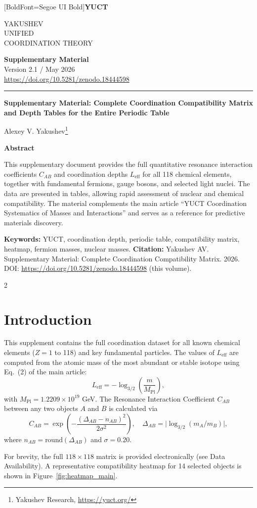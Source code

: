 \documentclass[11pt,a4paper]{article}
\newcommand{\makeheader}{%
	\noindent
	\begin{minipage}{0.17\textwidth}
		\raggedright
		{\fontspec{Segoe UI}[BoldFont=Segoe UI Bold]\bfseries\color{skyblue}\fontsize{46}{46}\selectfont YUCT}%
	\end{minipage}%
	\hspace{30pt}
	\begin{minipage}{0.32\textwidth}
		\raggedright
		{\sffamily\fontsize{11}{13}\selectfont YAKUSHEV\\ UNIFIED\\ COORDINATION THEORY}%
	\end{minipage}%
	\hfill
	\begin{minipage}{0.38\textwidth}
		\raggedleft
		{\sffamily\bfseries Supplementary Material}\\ 
		{\sffamily Version 2.1 / May 2026}\\ 
		{\sffamily\footnotesize \url{https://doi.org/10.5281/zenodo.18444598}}%
	\end{minipage}
	\par\vspace{5pt}
	\noindent\textcolor{gold}{\rule{\textwidth}{1.6pt}}
	\par\vspace{0pt}
}
\begin{document}
	\thispagestyle{firstpage}
	\makeheader
	
	\vspace{0cm}
	{\LARGE\bfseries Supplementary Material: Complete Coordination Compatibility Matrix \\ 
		\Large and Depth Tables for the Entire Periodic Table \par}
	\vspace{0.2cm}
	
	{\large Alexey V. Yakushev\footnote{Yakushev Research, \url{https://yuct.org/}}} \\
	\vspace{0.0cm}
	
	{\color{darkblue}\textbf{\LARGE Abstract}} \par
	{\large
		\noindent
		This supplementary document provides the full quantitative resonance interaction coefficients \(C_{AB}\) and coordination depths \(L_{\mathrm{eff}}\) for all 118 chemical elements, together with fundamental fermions, gauge bosons, and selected light nuclei. The data are presented in tables, allowing rapid assessment of nuclear and chemical compatibility. The material complements the main article ``YUCT Coordination Systematics of Masses and Interactions'' and serves as a reference for predictive materials discovery.
	}
	
	\vspace{0.1cm}
	\noindent
	{\color{darkblue}\textbf{Keywords:}} YUCT, coordination depth, periodic table, compatibility matrix, heatmap, fermion masses, nuclear masses.
	\vspace{0.1cm}
	\noindent
	{\color{darkblue}\textbf{Citation:}} Yakushev AV. Supplementary Material: Complete Coordination Compatibility Matrix. 2026. DOI: \url{https://doi.org/10.5281/zenodo.18444598} (this volume).
	
	\vspace{0.4cm}
	
	\begin{multicols}{2}
		\section*{Introduction}
		This supplement contains the full coordination dataset for all known chemical elements (\(Z = 1\) to 118) and key fundamental particles. The values of \(L_{\mathrm{eff}}\) are computed from the atomic mass of the most abundant or stable isotope using Eq.~(2) of the main article:
		\[
		L_{\mathrm{eff}} = -\log_{3/2}\!\left( \frac{m}{M_{\mathrm{Pl}}} \right),
		\]
		with \(M_{\mathrm{Pl}} = 1.2209\times 10^{19}\) GeV. The Resonance Interaction Coefficient \(C_{AB}\) between any two objects \(A\) and \(B\) is calculated via
		\[
		C_{AB} = \exp\!\left( - \frac{(\Delta_{AB} - n_{AB})^2}{2\sigma^2} \right),\quad
		\Delta_{AB} = \bigl|\log_{3/2}(m_A/m_B)\bigr|,
		\]
		where \(n_{AB} = \text{round}(\Delta_{AB})\) and \(\sigma = 0.20\).
		
		For brevity, the full \(118\times118\) matrix is provided electronically (see Data Availability). A representative compatibility heatmap for 14 selected objects is shown in Figure~\ref{fig:heatmap_main}.
	\end{multicols}
	
\end{document}
